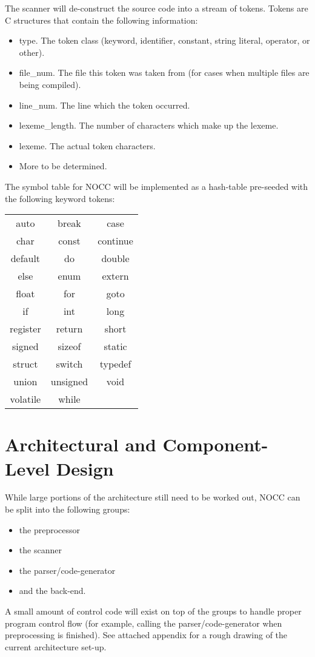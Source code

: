 \documentclass{article}
\begin{document}
The scanner will de-construct the source code into a stream of tokens.
Tokens are C structures that contain the following information:
\begin{itemize}
\item type. The token class (keyword, identifier, constant, string literal, operator, or other).
\item file\_num. The file this token was taken from (for cases when multiple files are being compiled).
\item line\_num.  The line which the token occurred.
\item lexeme\_length.  The number of characters which make up the lexeme.
\item lexeme.  The actual token characters.
\item More to be determined.
\end{itemize}

The symbol table for NOCC will be implemented as a hash-table pre-seeded with the following keyword tokens:
\begin{center}
\begin{tabular}{c c c}
auto &break & case\\
char & const & continue\\
default & do & double\\
else & enum & extern\\
float & for & goto\\
if & int & long\\
register & return & short\\
signed & sizeof & static\\
struct & switch & typedef\\
union & unsigned & void\\
volatile & while  & \\
\end{tabular}
\end{center}

\section{Architectural and Component-Level Design}
While large portions of the architecture still need to be worked out, NOCC can be split into the following groups:
\begin{itemize}
\item the preprocessor
\item the scanner
\item the parser/code-generator
\item and the back-end.
\end{itemize}
A small amount of control code will exist on top of the  groups to handle proper program control flow (for example, calling the parser/code-generator when preprocessing is finished).
See attached appendix for a rough drawing of the current architecture set-up.
\end{document}
